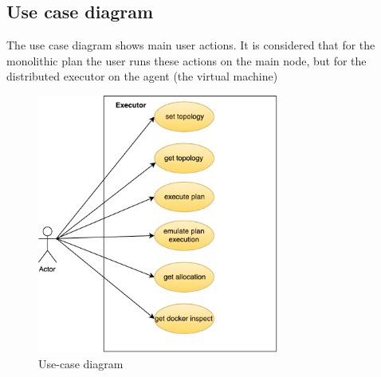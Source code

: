 \subsection{Use case diagram}
The use case diagram shows main user actions. It is considered that for the monolithic plan the user runs these actions on the main node, but for the distributed executor on the agent (the virtual machine)
\begin{figure}[ht]
  \centering
    \includegraphics[width=300px,height=322px,natwidth=404,natheight=433]{./pictures/use-case}
    \caption{Use-case diagram}
\end{figure}